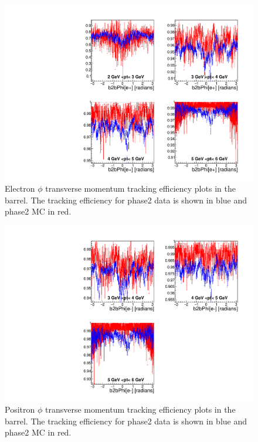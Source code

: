\documentclass[a4paper,11pt,twosided,final,german,openbib,pdftex,listof=totoc,bibliography=totoc]{scrbook}
\begin{document}
\begin{figure}[!htbp]
	\centering
	\includegraphics[width=\textwidth]{Plots/master/xPtMPhiemBarrel}
	\caption[Transverse Momentum $\phi$ Electron Barrel Efficiency Phase2]{Electron $\phi$ transverse momentum tracking efficiency plots in the barrel. The tracking efficiency for phase2 data is shown in blue and phase2 MC in red.
	\label{plt:xPtMPhiemBarrel}	}
\end{figure}

\begin{figure}[!htbp]
	\centering
	\includegraphics[width=\textwidth]{Plots/master/xPtMPhiepBarrel}
	\caption[Transverse Momentum $\phi$ Positron Barrel Efficiency Phase2]{Positron $\phi$ transverse momentum tracking efficiency plots in the barrel. The tracking efficiency for phase2 data is shown in blue and phase2 MC in red.
		\label{plt:xPtMPhiepBarrel}	}
\end{figure}
\end{document}
